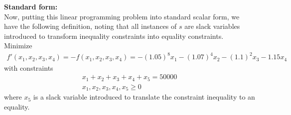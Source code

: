 \documentclass[11pt]{article}
\begin{document}
\begin{sol}
\textbf{Standard form:} \\
Now, putting this linear programming problem into standard scalar form, we have the following definition, noting that all instances of $s$ are slack variables introduced to transform inequality constraints into equality constraints.  \\

Minimize 
\begin{eqnarray*}
f'(x_{1}, x_{2}, x_{3}, x_{4}) = -f(x_{1}, x_{2}, x_{3}, x_{4}) = -(1.05)^{8}x_{1} -(1.07)^{4}x_{2} -(1.1)^{2}x_{3} -1.15x_{4}
\end{eqnarray*}
with constraints 
\begin{eqnarray*}
x_{1} + x_{2} + x_{3} + x_{4} + x_{5} = 50000 \\
x_{1}, x_{2}, x_{3}, x_{4}, x_{5} \geq 0 
\end{eqnarray*}
where $x_{5}$ is a slack variable introduced to translate the constraint inequality to an equality.
\end{sol}
\end{document}
